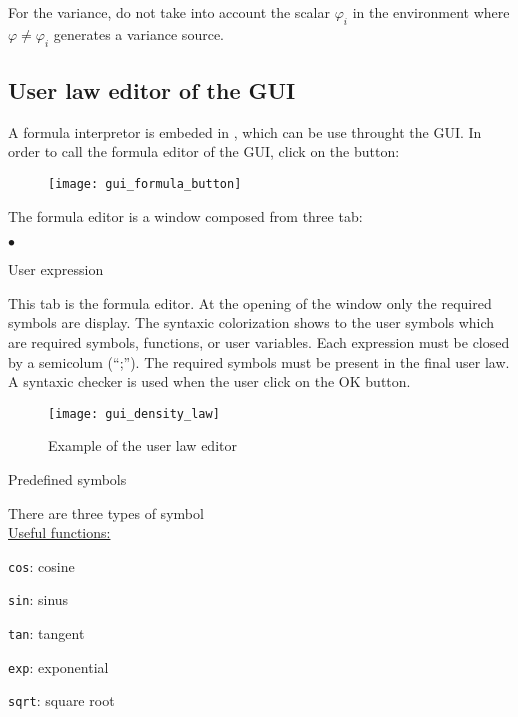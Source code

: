 {{{For the variance, do not take into account the scalar $\varphi_i$ in the environment
where $\varphi\ne\varphi_i$ generates a variance source.

\subsection{User law editor of the GUI}

A formula interpretor is embeded in \CS, which can be use throught the GUI.
In order to call the formula editor of the GUI, click on the button:

\begin{figure}[!ht]
\begin{center}
\texttt{[image: gui\_formula\_button]}
\label{fig:mei_button}
\end{center}
\end{figure}

The formula editor is a window composed from three tab:
\begin{list}{$\bullet$}{}
\item User expression

This tab is the formula editor. At the opening of the
window only the required symbols are display.
The syntaxic colorization shows to the user symbols which are
required symbols, functions, or user variables.
Each expression must be closed by a semicolum (``;''). The
required symbols must be present in the final user law. A
syntaxic checker is used when the user click on the OK button.

\begin{figure}[!ht]
\begin{center}
\texttt{[image: gui\_density\_law]}
\caption{Example of the user law editor}
\label{fig:mei_editor}
\end{center}
\end{figure}

\item Predefined symbols

There are three types of symbol \\

\underline{Useful functions:}

\texttt{cos}: cosine

\texttt{sin}: sinus

\texttt{tan}: tangent

\texttt{exp}: exponential

\texttt{sqrt}: square root


\end{list}}}}
